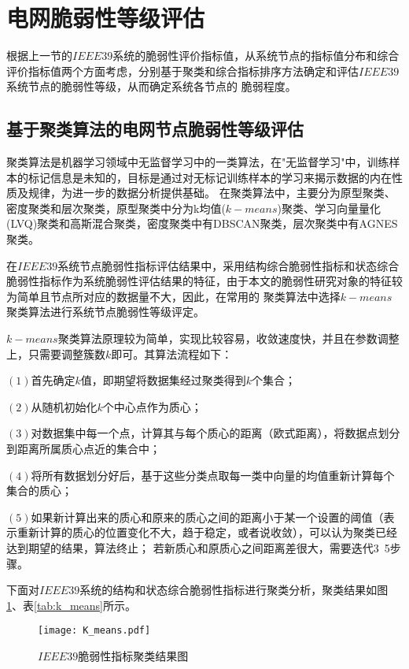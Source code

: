 \section{电网脆弱性等级评估}
\label{sec:multiAssessment}
根据上一节的$IEEE39$系统的脆弱性评价指标值，从系统节点的指标值分布和综合评价指标值两个方面考虑，分别基于聚类和综合指标排序方法确定和评估$IEEE39$系统节点的脆弱性等级，从而确定系统各节点的
脆弱程度。

\subsection{基于聚类算法的电网节点脆弱性等级评估}
\label{sec:K_means1}

聚类算法是机器学习领域中无监督学习中的一类算法，在"无监督学习"中，训练样本的标记信息是未知的，目标是通过对无标记训练样本的学习来揭示数据的内在性质及规律，为进一步的数据分析提供基础\cite{refs82}。
在聚类算法中，主要分为原型聚类、密度聚类和层次聚类，原型聚类中分为k均值($k-means$)聚类、学习向量量化(LVQ)聚类和高斯混合聚类，密度聚类中有DBSCAN聚类，层次聚类中有AGNES聚类。

在$IEEE39$系统节点脆弱性指标评估结果中，采用结构综合脆弱性指标和状态综合脆弱性指标作为系统脆弱性评估结果的特征，由于本文的脆弱性研究对象的特征较为简单且节点所对应的数据量不大，因此，在常用的
聚类算法中选择$k-means$聚类算法进行系统节点脆弱性等级评定。

$k-means$聚类算法原理较为简单，实现比较容易，收敛速度快，并且在参数调整上，只需要调整簇数$k$即可。其算法流程如下：

$(1)$首先确定$k$值，即期望将数据集经过聚类得到$k$个集合；

$(2)$从随机初始化$k$个中心点作为质心；

$(3)$对数据集中每一个点，计算其与每个质心的距离（欧式距离），将数据点划分到距离所属质心点近的集合中；

$(4)$将所有数据划分好后，基于这些分类点取每一类中向量的均值重新计算每个集合的质心；

$(5)$如果新计算出来的质心和原来的质心之间的距离小于某一个设置的阈值（表示重新计算的质心的位置变化不大，趋于稳定，或者说收敛），可以认为聚类已经达到期望的结果，算法终止；
若新质心和原质心之间距离差很大，需要迭代3~5步骤。

下面对$IEEE39$系统的结构和状态综合脆弱性指标进行聚类分析，聚类结果如图\ref{fig:K_means}、表\ref{tab:k_means}所示。
\begin{figure}[H] %
  \centering
  \texttt{[image: K\_means.pdf]}
  \caption{$IEEE39$脆弱性指标聚类结果图}
  \label{fig:K_means}
\end{figure}

